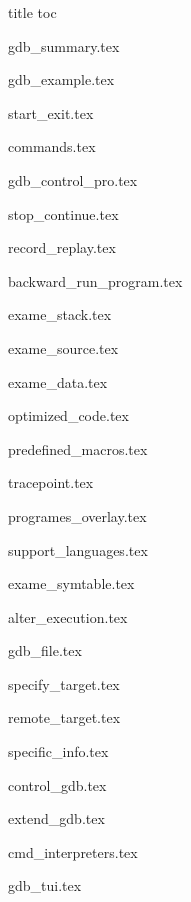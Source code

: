 \documentclass[12pt,twoside,a4paper,openright]{book}
\begin{document}
\begin{CJK}{UTF8}{gbsn}

{title}
{toc}


{gdb_summary.tex}

\setcounter{chapter}{0}

{gdb_example.tex}

{start_exit.tex}

{commands.tex}

{gdb_control_pro.tex}

{stop_continue.tex}

{record_replay.tex}

{backward_run_program.tex}

{exame_stack.tex}

{exame_source.tex}

{exame_data.tex}

{optimized_code.tex}

{predefined_macros.tex}

{tracepoint.tex}

{programes_overlay.tex}

{support_languages.tex}

{exame_symtable.tex}

{alter_execution.tex}

{gdb_file.tex}

{specify_target.tex}

{remote_target.tex}

{specific_info.tex}

{control_gdb.tex}

{extend_gdb.tex}

{cmd_interpreters.tex}

{gdb_tui.tex}


\end{CJK}
\end{document}
